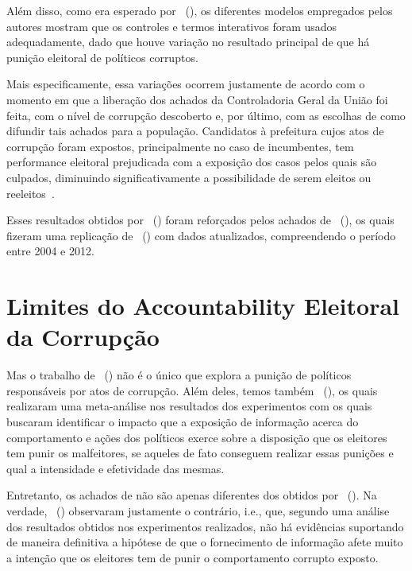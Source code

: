\documentclass[
	12pt,				%
	openright,			%
	twoside,			%
	a4paper,			%
	openany,
	english,			%
	brazil				%
	]{abntex2}
\begin{document}
Além disso, como era esperado por ~(\citeyear{ferraz2008exposing}), os diferentes modelos empregados pelos autores mostram que os controles e termos interativos foram usados adequadamente, dado que houve variação no resultado principal de que há punição eleitoral de políticos corruptos.

Mais especificamente, essa variações ocorrem justamente de acordo com o momento em que a liberação dos achados da Controladoria Geral da União foi feita, com o nível de corrupção descoberto e, por último, com as escolhas de como difundir tais achados para a população. Candidatos à prefeitura cujos atos de corrupção foram expostos, principalmente no caso de incumbentes, tem performance eleitoral prejudicada com a exposição dos casos pelos quais são culpados, diminuindo significativamente a possibilidade de serem eleitos ou reeleitos~\cite{ferraz2008exposing}.

Esses resultados obtidos por ~(\citeyear{ferraz2008exposing}) foram reforçados pelos achados de ~(\citeyear{Avis2018Oct}), os quais fizeram uma replicação de ~(\citeyear{ferraz2008exposing}) com dados atualizados, compreendendo o período entre 2004 e 2012.

\section{Limites do Accountability Eleitoral da Corrupção}

Mas o trabalho de ~(\citeyear{ferraz2008exposing}) não é o único que explora a punição de políticos responsáveis por atos de corrupção. Além deles, temos também ~(\citeyear{dunning2019voter}), os quais realizaram uma meta-análise nos resultados dos experimentos com os quais buscaram identificar o impacto que a exposição de informação acerca do comportamento e ações dos políticos exerce sobre a disposição que os eleitores tem punir os malfeitores, se aqueles de fato conseguem realizar essas punições e qual a intensidade e efetividade das mesmas.

Entretanto, os achados de \cite{dunning2019voter} não são apenas diferentes dos obtidos por ~(\citeyear{ferraz2008exposing}). Na verdade, ~(\citeyear{dunning2019voter}) observaram justamente o contrário, i.e., que, segundo uma análise dos resultados obtidos nos experimentos realizados, não há evidências suportando de maneira definitiva a hipótese de que o fornecimento de informação afete muito a intenção que os eleitores tem de punir o comportamento corrupto exposto.
\end{document}

